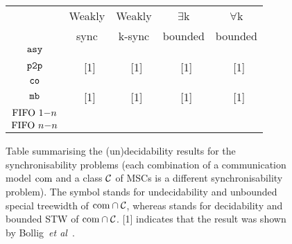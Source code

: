 \newcommand{\cmark}{\ding{51}}%
\newcommand{\xmark}{\ding{55}}%
\begin{figure}[t]
		\begin{tabular}{| c | c | c|  c| c| }
			\hline
			& Weakly  & Weakly  & $\exists$k & $\forall$k  \\
			& sync & k-sync & bounded & bounded \\
			\hline \hline
			$\mathtt{asy}$ &  \xmark & \cmark & \cmark & \cmark \\
			\hline
			$\mathtt{p2p}$  & \xmark~[1] & \cmark~[1] & \cmark~[1] & \cmark~[1] \\
			\hline
			$\mathtt{co}$  & \xmark & \cmark & \cmark & \cmark \\
			\hline
			$\mathtt{mb}$ & \cmark~[1] & \cmark~[1] & \cmark~[1] & \cmark~[1] \\
			\hline
			$\text{FIFO } 1\mathsf{-}n$ & \cmark & \cmark & \cmark & \cmark \\
			\hline
			$\text{FIFO } n\mathsf{-}n$ & \cmark & \cmark & \cmark & \cmark \\
			\hline
		\end{tabular}
		\caption{Table summarising the (un)decidability results for the synchronisability problems (each 
		combination of a communication model $\textup{com}$ and a class $\mathcal{C}$ of MSCs is a different 
		synchronisability problem). 
		The symbol \xmark\;stands for undecidability and unbounded special treewidth
		of $\textup{com}\cap \mathcal{C}$, whereas \cmark\;stands for decidability and bounded STW
		of $\textup{com}\cap \mathcal{C}$.  
		[1] indicates that the result was shown by Bollig~\emph{et al}~\cite{DBLP:conf/concur/BolligGFLLS21}.}
		\label{fig:stw-bound}
\end{figure}
